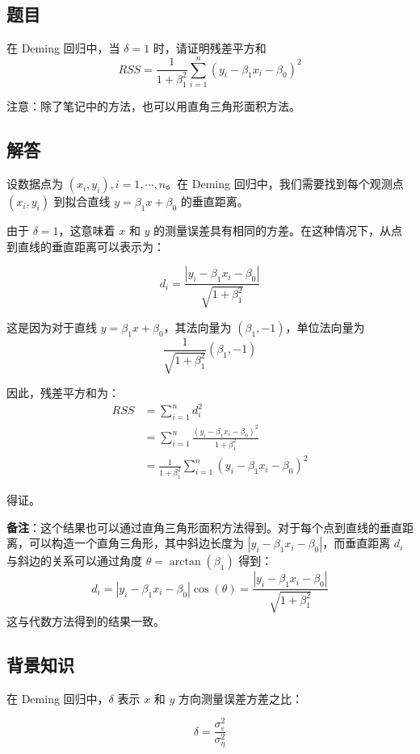 \documentclass[UTF8]{report}
\theoremstyle{MyLineTheoremStyle} %
\theoremstyle{MyBlockTheoremStyle} %
\theoremstyle{MySubsubsectionStyle} %
\begin{document}
\subsection*{题目}

在 Deming 回归中，当 $\delta = 1$ 时，请证明残差平方和
\[
RSS = \frac{1}{1 + \beta_1^2} \sum_{i=1}^{n} (y_i - \beta_1 x_i - \beta_0)^2
\]

注意：除了笔记中的方法，也可以用直角三角形面积方法。



\subsection*{解答}
设数据点为 $(x_i, y_i), i = 1,\cdots,n$。在 Deming 回归中，我们需要找到每个观测点 $(x_i, y_i)$ 到拟合直线 $y = \beta_1 x + \beta_0$ 的垂直距离。

由于 $\delta = 1$，这意味着 $x$ 和 $y$ 的测量误差具有相同的方差。在这种情况下，从点到直线的垂直距离可以表示为：

$$
d_i = \frac{|y_i - \beta_1 x_i - \beta_0|}{\sqrt{1 + \beta_1^2}}
$$

这是因为对于直线 $y = \beta_1 x + \beta_0$，其法向量为 $(\beta_1, -1)$，单位法向量为 
$$
\frac{1}{\sqrt{1 + \beta_1^2}}(\beta_1, -1)
$$

因此，残差平方和为：
\begin{align*}
RSS &= \sum_{i=1}^n d_i^2 \\
&= \sum_{i=1}^n \frac{(y_i - \beta_1 x_i - \beta_0)^2}{1 + \beta_1^2} \\
&= \frac{1}{1 + \beta_1^2} \sum_{i=1}^n (y_i - \beta_1 x_i - \beta_0)^2
\end{align*}

得证。

\textbf{备注}：这个结果也可以通过直角三角形面积方法得到。对于每个点到直线的垂直距离，可以构造一个直角三角形，其中斜边长度为 $|y_i - \beta_1 x_i - \beta_0|$，而垂直距离 $d_i$ 与斜边的关系可以通过角度 $\theta = \arctan(\beta_1)$ 得到：
$$
d_i = |y_i - \beta_1 x_i - \beta_0| \cos(\theta) = \frac{|y_i - \beta_1 x_i - \beta_0|}{\sqrt{1 + \beta_1^2}}
$$
这与代数方法得到的结果一致。


\subsection*{背景知识}
在 Deming 回归中，$\delta$ 表示 $x$ 和 $y$ 方向测量误差方差之比：

$$
\delta = \frac{\sigma^2_\varepsilon}{\sigma^2_\eta}
$$
\end{document}
